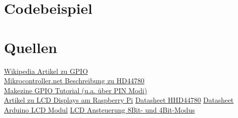 \documentclass[a4paper,11pt]{article}
\begin{document}
\section*{Codebeispiel}


\section*{Quellen}
\href{https://en.wikipedia.org/wiki/General-purpose_input/output}{Wikipedia Artikel zu GPIO}\\
\href{http://www.mikrocontroller.net/articles/HD44780}{Mikrocontroller.net Beschreibung zu HD44780}\\
\href{http://makezine.com/projects/tutorial-raspberry-pi-gpio-pins-and-python/}{Makezine GPIO Tutorial (u.a. über PIN Modi)}\\
\href{https://projects.drogon.net/raspberry-pi/gpio-examples/lcd-interface/}{Artikel zu LCD Displays am Raspberry Pi}
\href{https://www.sparkfun.com/datasheets/LCD/HD44780.pdf}{Datasheet HHD44780}
\href{http://www.protostack.com/download/YJD1602A-1\%20datasheet.pdf}{Datasheet Arduino LCD Modul}
\href{http://www.protostack.com/blog/2010/03/character-lcd-displays-part-1/}{LCD Ansteuerung 8Bit- und 4Bit-Modus}
\end{document}
